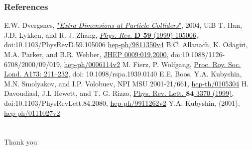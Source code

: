\documentclass[10pt]{beamer}
\begin{document}
	\begin{frame}
		\frametitle{References}
		\begin{thebibliography}{9}
			E.W. Dvergsnes, \href{http://bora.uib.no/bitstream/handle/1956/847/THESIS.pdf?sequence=1}{"\emph{Extra Dimensions at Particle Colliders}"}, 2004, UiB
			T. Han, J.D. Lykken, and R.-J. Zhang,
			\href{http://journals.aps.org/prd/abstract/10.1103/PhysRevD.59.105006}{\emph{Phys. Rev.} {\bfseries D 59} (1999) 105006}, doi:10.1103/PhysRevD.59.105006 \href{http://xxx.lanl.gov/abs/hep-ph/9811350v4}{hep-ph/9811350v4}
			B.C. Allanach, K. Odagiri, M.A. Parker, and B.R. Webber,
			\href{http://iopscience.iop.org/article/10.1088/1126-6708/2000/09/019/meta;jsessionid=8B906F8B155A00E75050CBB02B18326C.c4.iopscience.cld.iop.org}{JHEP 0009:019,2000}, doi:10.1088/1126-6708/2000/09/019, \href{http://arxiv.org/abs/hep-ph/0006114v2}{hep-ph/0006114v2}
			M. Fierz, P. Wolfgang, \href{http://rspa.royalsocietypublishing.org/content/173/953/211}{Proc. Roy. Soc. Lond. A173: 211–232}, doi: 10.1098/rspa.1939.0140
			E.E. Boos, Y.A. Kubyshin, M.N. Smolyakov, and I.P. Volobuev, NPI MSU 2001-21/661, \href{http://arxiv.org/abs/hep-th/0105304}{hep-th/0105304}
			H. Davoudiasl, J.L Hewett, and T. G. Rizzo, \href{http://journals.aps.org/prl/abstract/10.1103/PhysRevLett.84.2080}{Phys. Rev. Lett. $\bm{84}$ 3370 (1999)}, doi:10.1103/PhysRevLett.84.2080, \href{http://arxiv.org/pdf/hep-ph/9911262v2.pdf}{hep-ph/9911262v2}
			Y.A. Kubyshin, (2001), \href{http://arxiv.org/abs/hep-ph/0111027v2}{hep-ph/0111027v2}
		\end{thebibliography}
	\end{frame}

	\section{}
	\begin{frame}
		\centering
		Thank you
	\end{frame}
\end{document}
